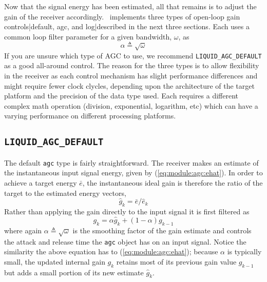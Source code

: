 Now that the signal energy has been estimated, all that remains is to
adjust the gain of the receiver accordingly.
\liquid\ implements three types of open-loop gain controls|default, agc,
and log|described in the next three sections.
Each uses a common loop filter parameter for a given bandwidth,
$\omega$, as
%
\begin{equation}
\label{eqn:agc:alpha}
    \alpha \triangleq \sqrt{\omega}
\end{equation}
%
If you are unsure which type of AGC to use, we recommend
{\tt LIQUID\_AGC\_DEFAULT} as a good all-around control.
The reason for the three types is to allow flexibility in the receiver as
each control mechanism has slight performance differences and might require
fewer clock clycles, depending upon the architecture of the target platform
and the precision of the data type used.
Each requires a different complex math operation (division, exponential,
logarithm, etc) which can have a varying performance on different processing
platforms.

\subsection{{\tt LIQUID\_AGC\_DEFAULT}}
\label{module:agc:default}
The default {\tt agc} type is fairly straightforward.
The receiver makes an estimate of the instantaneous input signal energy, given
by (\ref{eq:module:agc:ehat}).
In order to achieve a target energy $\bar{e}$, the instantaneous ideal gain is
therefore the ratio of the target to the estimated energy vectors,
%
\begin{equation}
\label{eqn:agc:default:ghat}
    \hat{g}_{k} = \bar{e} / \hat{e}_k
\end{equation}
%
Rather than applying the gain directly to the input signal it is first
filtered as
%
\begin{equation}
\label{eqn:agc:default:g}
    g_{k} = \alpha \hat{g}_{k} + (1-\alpha) g_{k-1}
\end{equation}
%
where again $\alpha \triangleq \sqrt{\omega}$ is the smoothing factor of
the gain estimate and controls the attack and release time the {\tt agc}
object has on an input signal.
Notice the similarity the above equation has to
(\ref{eq:module:agc:ehat});
because $\alpha$ is typically small, the updated internal gain $g_{k}$
retains most of its previous gain value $g_{k-1}$ but adds a small
portion of its new estimate $\hat{g}_{k}$.

